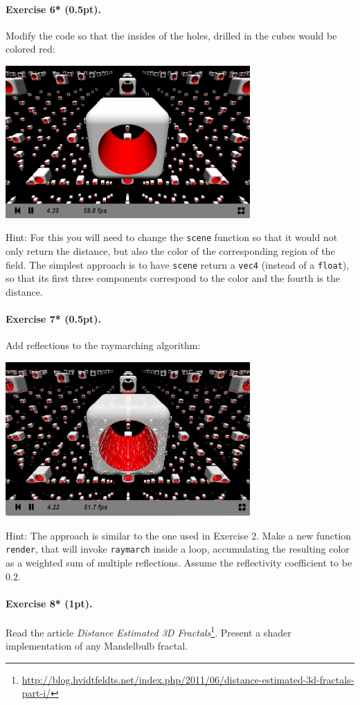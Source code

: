 \documentclass{article}
\newenvironment{exercise}[2]{\paragraph{Exercise #1 (#2pt).} }{
\medskip}
\begin{document}
\begin{exercise}{6*}{0.5}
Modify the code so that the insides of the holes, drilled in the cubes would be colored red:
\begin{center}
\includegraphics[width=0.7\textwidth]{raymarching3.png}
\end{center}
Hint: For this you will need to change the \texttt{scene} function so that it would not only return the distance, but also the color of the corresponding region of the field. The simplest approach is to have \texttt{scene} return a \texttt{vec4} (instead of a \texttt{float}), so that its first three components correspond to the color and the fourth is the distance.
\end{exercise}

\begin{exercise}{7*}{0.5}
Add reflections to the raymarching algorithm:
\begin{center}
\includegraphics[width=0.7\textwidth]{raymarching4.png}
\end{center}
Hint: The approach is similar to the one used in Exercise 2. Make a new function \texttt{render}, that will invoke \texttt{raymarch} inside a loop, accumulating the resulting color as a weighted sum of multiple reflections. Assume the reflectivity coefficient to be $0.2$.
\end{exercise}


\begin{exercise}{8*}{1}
Read the article \emph{Distance Estimated 3D Fractals}\footnote{\url{http://blog.hvidtfeldts.net/index.php/2011/06/distance-estimated-3d-fractals-part-i/}}. Present a shader implementation of any Mandelbulb fractal.
\end{exercise}
\end{document}
